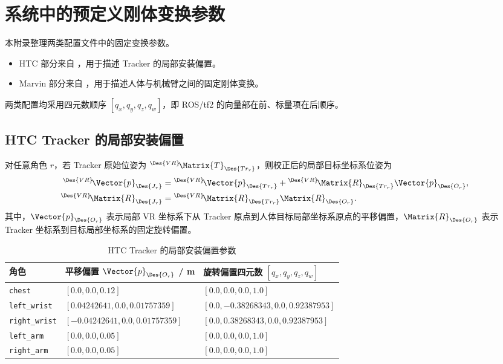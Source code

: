 \chapter{系统中的预定义刚体变换参数}\label{app:pretransform}

本附录整理两类配置文件中的固定变换参数。

\begin{itemize}
    \item HTC 部分来自 ，用于描述 Tracker 的局部安装偏置。
    \item Marvin 部分来自 ，用于描述人体与机械臂之间的固定刚体变换。
\end{itemize}

两类配置均采用四元数顺序 $\left[q_x, q_y, q_z, q_w\right]$，即 ROS/tf2 的向量部在前、标量项在后顺序。

\section{HTC Tracker 的局部安装偏置}

对任意角色 $r$，若 Tracker 原始位姿为 ${}^{\Des{VR}}\!\Matrix{T}_{\Des{Tr_r}}$，则校正后的局部目标坐标系位姿为
\begin{align}
    {}^{\Des{VR}}\!\Vector{p}_{\Des{J_r}} &=
    {}^{\Des{VR}}\!\Vector{p}_{\Des{Tr_r}} +
    {}^{\Des{VR}}\!\Matrix{R}_{\Des{Tr_r}}\Vector{p}_{\Des{O_r}},\\
    {}^{\Des{VR}}\!\Matrix{R}_{\Des{J_r}} &=
    {}^{\Des{VR}}\!\Matrix{R}_{\Des{Tr_r}}\Matrix{R}_{\Des{O_r}}.
\end{align}
其中，$\Vector{p}_{\Des{O_r}}$ 表示局部 VR 坐标系下从 Tracker 原点到人体目标局部坐标系原点的平移偏置，$\Matrix{R}_{\Des{O_r}}$ 表示 Tracker 坐标系到目标局部坐标系的固定旋转偏置。

\begin{table}[htbp]
    \centering
    \footnotesize
    \setlength{\tabcolsep}{3pt}
    \caption{HTC Tracker 的局部安装偏置参数}
    \label{tab:htc-pretransform}
    \begin{tabular}{p{} p{} p{}}
        \hline
        角色 & 平移偏置 $\Vector{p}_{\Des{O_r}}$ / m & 旋转偏置四元数 $\left[q_x, q_y, q_z, q_w\right]$ \\
        \hline
        \texttt{chest} & $\left[0.0, 0.0, 0.12\right]$ & $\left[0.0, 0.0, 0.0, 1.0\right]$ \\
        \texttt{left\_wrist} & $\left[0.04242641, 0.0, 0.01757359\right]$ & $\left[0.0, -0.38268343, 0.0, 0.92387953\right]$ \\
        \texttt{right\_wrist} & $\left[-0.04242641, 0.0, 0.01757359\right]$ & $\left[0.0, 0.38268343, 0.0, 0.92387953\right]$ \\
        \texttt{left\_arm} & $\left[0.0, 0.0, 0.05\right]$ & $\left[0.0, 0.0, 0.0, 1.0\right]$ \\
        \texttt{right\_arm} & $\left[0.0, 0.0, 0.05\right]$ & $\left[0.0, 0.0, 0.0, 1.0\right]$ \\
        \hline
    \end{tabular}
\end{table}

